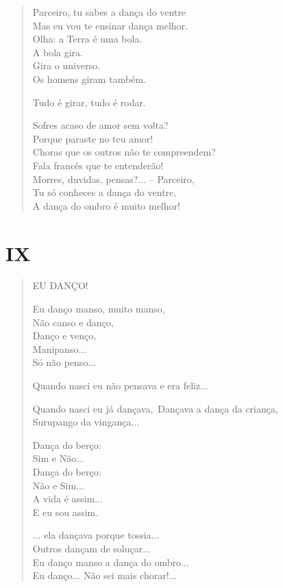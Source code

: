 \begin{verse}
Parceiro, tu sabes a dança do ventre\\
Mas eu vou te ensinar dança melhor.\\
Olha: a Terra é uma bola.\\
\quad\quad\quad\quad{}A bola gira.\\
\quad\quad\quad{}Gira o universo.\\
\quad\quad{}Os homens giram também.

Tudo é girar, tudo é rodar.

\quad{}Sofres acaso de amor sem volta?\\
\quad{}Porque paraste no teu amor!\\
\quad\quad{}Choras que os outros não te compreendem?\\
\quad\quad{}Fala francês que te entenderão!\\
\quad\quad\quad{}Morres, duvidas, pensas?... -- Parceiro,\\
Tu só conheces a dança do ventre,\\
A dança do ombro é muito melhor!
\end{verse}

\pagebreak
\section{IX}

\begin{verse}
EU DANÇO!

Eu danço manso, muito manso,\\
Não canso e danço,\\
Danço e venço,\\
\quad{}Manipanso...\\
\quad\quad{}Só não penso...

Quando nasci eu não pensava e era feliz...

Quando nasci eu já dançava,\
Dançava a dança da criança,\\
\quad{}Surupango da vingança...

Dança do berço:\\
\quad{}Sim e Não...\\
Dança do berço:\\
\quad{}Não e Sim...\\
\quad\quad{}A vida é assim...\\
E eu sou assim.

... ela dançava porque tossia...\\
\quad{}Outros dançam de soluçar...\\
\quad\quad{}Eu danço manso a dança do ombro...\\
\quad\quad\quad{}Eu danço... Não sei mais chorar!...
\end{verse}

